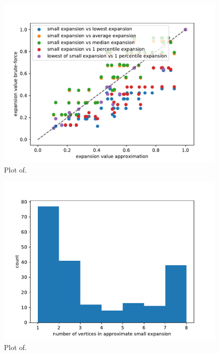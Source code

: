\begin{figure}
	\centering
	\includegraphics[scale=1]{figures/quality_evaluation_log_expansion_values_for_same_number_verticies.pdf}
	\caption[Plot ]{Plot of.}
\end{figure}


\begin{figure}
	\centering
	\includegraphics[scale=1]{figures/quality_evaluation_log_small_expansion_sizes.pdf}
	\caption[Plot ]{Plot of.}
\end{figure}


